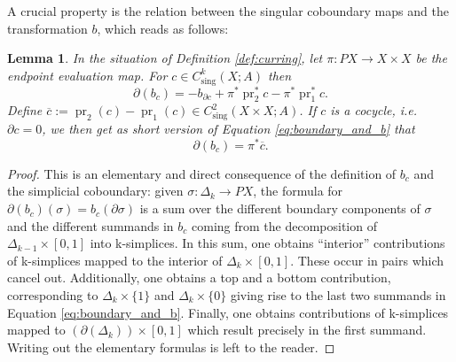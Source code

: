 \documentclass[a4paper,twoside]{article}
\theoremstyle{plain}
\newtheorem{lemma}[theorem]{Lemma}
\newtheorem{proposition}[theorem]{Proposition}
\theoremstyle{definition}
\theoremstyle{remark}
\newcommand{\boundary}[1]{\partial#1}
\DeclareMathOperator{\sing}{sing}
\DeclareMathOperator{\pr}{pr}
\begin{document}
A crucial property is the relation between the singular coboundary maps and
the transformation $b$, which reads as follows:

\begin{lemma}
  In the situation of Definition \ref{def:curring}, let $\pi\colon PX\to
  X\times X$ be the endpoint evaluation map. For $c\in
  C^{k}_{\sing}(X;A)$ then
  \begin{equation}\label{eq:boundary_and_b}
   \boundary (b_c) =-  b_{\boundary c}  + \pi^*\pr_2^*c -\pi^*\pr_1^*c.
 \end{equation}
  Define $\overline
  c:=\pr_2(c) - \pr_1(c)\in C^2_{\sing}(X\times X;A)$. If $c$ is a cocycle,
  i.e.~$\boundary c=0$, we then get as short version of Equation
  \eqref{eq:boundary_and_b} that
  \begin{equation*}
    \partial(b_c) =\pi^*\overline{c}.
  \end{equation*}
\end{lemma}
\begin{proof}
  This is an elementary and direct consequence of the definition of $b_c$ and
  the simplicial coboundary: given $\sigma\colon \Delta_k\to PX$, the formula
  for $\boundary(b_c)(\sigma)=b_c(\boundary\sigma)$ is a sum over the
  different boundary components of $\sigma$ and the different summands in
  $b_c$ coming from the decomposition of $\Delta_{k-1}\times [0,1]$ into
  k-simplices. In this sum, one obtains ``interior'' contributions of
  k-simplices mapped to the interior of $\Delta_k\times [0,1]$. These occur in
  pairs which cancel out. Additionally, one obtains a top and a bottom
  contribution, corresponding to $\Delta_k\times \{1\}$ and $\Delta_k\times
  \{0\}$ giving rise to the last two summands in Equation
  \eqref{eq:boundary_and_b}. Finally, one obtains contributions of k-simplices
  mapped to $(\boundary(\Delta_k) )\times [0,1]$ which result precisely in the
  first summand. Writing out the elementary formulas is left to the reader.
\end{proof}



\end{document}
